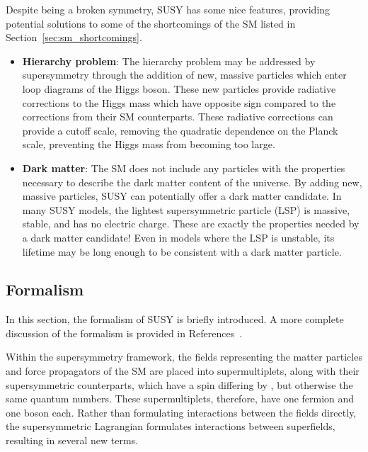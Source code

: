 Despite being a broken symmetry, SUSY has some nice features, providing
potential solutions to some of the shortcomings of the SM listed in
Section~\ref{sec:sm_shortcomings}.
\begin{itemize}
  \item \textbf{Hierarchy problem}: The hierarchy problem may be addressed by
    supersymmetry through the addition of new, massive particles which enter
    loop diagrams of the Higgs boson.
    These new particles provide radiative corrections to the Higgs mass which
    have opposite sign compared to the corrections from their SM counterparts.
    These radiative corrections can provide a cutoff scale, removing the
    quadratic dependence on the Planck scale, preventing the Higgs mass from
    becoming too large.
  \item \textbf{Dark matter}: The SM does not include any particles with the
    properties necessary to describe the dark matter content of the universe.
    By adding new, massive particles, SUSY can potentially offer a dark matter
    candidate.
    In many SUSY models, the lightest supersymmetric particle (LSP) is massive,
    stable, and has no electric charge.
    These are exactly the properties needed by a dark matter candidate!
    Even in models where the LSP is unstable, its lifetime may be long enough
    to be consistent with a dark matter particle.
\end{itemize}

\FloatBarrier
\subsection{Formalism}
\label{sec:susy_formalism}
In this section, the formalism of SUSY is briefly introduced.
A more complete discussion of the formalism is provided in
References~\cite{aitchison2007supersymmetry,Martin:1997ns,Polonsky:2001pn}.

Within the supersymmetry framework, the fields representing the matter
particles and force propagators of the SM are placed into supermultiplets,
along with their supersymmetric counterparts, which have a spin differing
by , but otherwise the same quantum numbers.
These supermultiplets, therefore, have one fermion and one boson each.
Rather than formulating interactions between the fields directly, the
supersymmetric Lagrangian formulates interactions between superfields,
resulting in several new terms.

